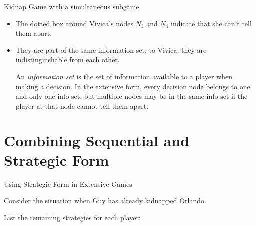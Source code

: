 \documentclass{beamer}
\theoremstyle{plain}
\begin{document}

\begin{frame}{Kidnap Game with a simultaneous subgame}
  \begin{center}
    
  \end{center}
\end{frame}


\begin{frame}
  \begin{itemize}

    \item The dotted box around Vivica's nodes $N_3$ and $N_4$
    indicate that she can't tell them apart.

    \item They are part of the same \alert{information set}; 
    to Vivica, they are indistinguishable from each other.

    \begin{definition}
      An \textit{information set} 
      is the set of information available to a player when making a decision. 
      In the extensive form, 
      every decision node belongs to one and only one info set,
      but multiple nodes may be in the same info set 
      if the player at that node cannot tell them apart.
    \end{definition}

  \end{itemize}
\end{frame}

\section{Combining Sequential and Strategic Form}
\begin{frame}{Using Strategic Form in Extensive Games}

  Consider the situation when Guy has already kidnapped Orlando.

  List the remaining strategies for each player:
  
\end{frame}

\end{document}
